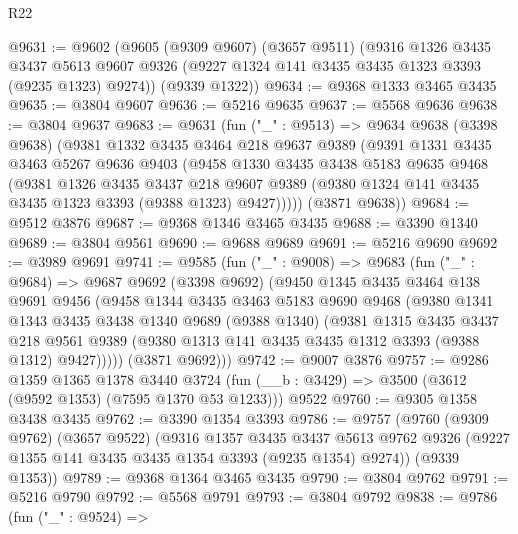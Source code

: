 \begin{lexlean}{R22}
\begin{coremodule}
@9631 := @9602
    (@9605
      (@9309 @9607)
      (@3657 @9511)
      (@9316
        @1326
        @3435
        @3437
        @5613
        @9607
        @9326
        (@9227 @1324 @141 @3435 @3435 @1323 @3393 (@9235 @1323) @9274))
      (@9339 @1322))
@9634 := @9368 @1333 @3465 @3435
@9635 := @3804 @9607
@9636 := @5216 @9635
@9637 := @5568 @9636
@9638 := @3804 @9637
@9683 := @9631
    (fun ("_" : @9513) =>
    @9634
      @9638
      (@3398 @9638)
      (@9381
        @1332
        @3435
        @3464
        @218
        @9637
        @9389
        (@9391
          @1331
          @3435
          @3463
          @5267
          @9636
          @9403
          (@9458
            @1330
            @3435
            @3438
            @5183
            @9635
            @9468
            (@9381
              @1326
              @3435
              @3437
              @218
              @9607
              @9389
              (@9380 @1324 @141 @3435 @3435 @1323 @3393 (@9388 @1323) @9427)))))
      (@3871 @9638))
@9684 := @9512 @3876
@9687 := @9368 @1346 @3465 @3435
@9688 := @3390 @1340
@9689 := @3804 @9561
@9690 := @9688 @9689
@9691 := @5216 @9690
@9692 := @3989 @9691
@9741 := @9585
    (fun ("_" : @9008) =>
    @9683
      (fun ("_" : @9684) =>
      @9687
        @9692
        (@3398 @9692)
        (@9450
          @1345
          @3435
          @3464
          @138
          @9691
          @9456
          (@9458
            @1344
            @3435
            @3463
            @5183
            @9690
            @9468
            (@9380
              @1341
              @1343
              @3435
              @3438
              @1340
              @9689
              (@9388 @1340)
              (@9381
                @1315
                @3435
                @3437
                @218
                @9561
                @9389
                (@9380 @1313 @141 @3435 @3435 @1312 @3393 (@9388 @1312) @9427)))))
        (@3871 @9692)))
@9742 := @9007 @3876
@9757 := @9286
    @1359
    @1365
    @1378
    @3440
    @3724
    (fun (__b : @3429) => @3500 (@3612 (@9592 @1353) (@7595 @1370 @53 @1233)))
    @9522
@9760 := @9305 @1358 @3438 @3435
@9762 := @3390 @1354 @3393
@9786 := @9757
    (@9760
      (@9309 @9762)
      (@3657 @9522)
      (@9316
        @1357
        @3435
        @3437
        @5613
        @9762
        @9326
        (@9227 @1355 @141 @3435 @3435 @1354 @3393 (@9235 @1354) @9274))
      (@9339 @1353))
@9789 := @9368 @1364 @3465 @3435
@9790 := @3804 @9762
@9791 := @5216 @9790
@9792 := @5568 @9791
@9793 := @3804 @9792
@9838 := @9786
    (fun ("_" : @9524) =>

\end{coremodule}
\end{lexlean}

